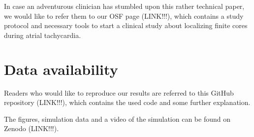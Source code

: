 \documentclass[twocolumn]{article}
\begin{document}
In case an adventurous clinician has stumbled upon this rather technical paper,
we would like to refer them to our OSF page (LINK!!!),
which contains a study protocol and necessary tools
to start a clinical study about localizing finite cores during atrial tachycardia.

\section{Data availability}

Readers who would like to reproduce our results are referred to this
GitHub repository (LINK!!!), which contains the used code and some
further explanation.

\noindent The figures, simulation data and a video of the simulation can be found on Zenodo (LINK!!!).

\printbibliography
\end{document}
